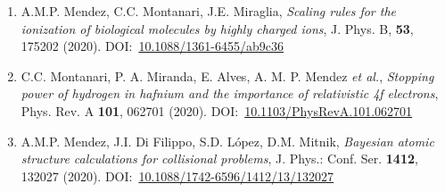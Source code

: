 \begin{enumerate}
\item
A.M.P. Mendez, C.C. Montanari, J.E. Miraglia,
\textit{Scaling rules for the ionization of biological molecules by highly charged ions},
J. Phys. B, \textbf{53}, 175202 (2020). 
DOI:~\href{http://www.doi.org/10.1088/1361-6455/ab9c36}{10.1088/1361-6455/ab9c36}

\item
C.C. Montanari, P. A. Miranda, E. Alves, A. M. P. Mendez \textit{et al.},
\textit{Stopping power of hydrogen in hafnium and the importance of relativistic 4f electrons},
Phys. Rev. A \textbf{101}, 062701 (2020).
DOI:~\href{http://www.doi.org/10.1103/PhysRevA.101.062701}{10.1103/PhysRevA.101.062701}

\item
A.M.P. Mendez, J.I. Di Filippo, S.D. López, D.M. Mitnik,
\textit{Bayesian atomic structure calculations for collisional problems},
J. Phys.: Conf. Ser. \textbf{1412}, 132027 (2020). 
DOI:~\href{http://www.doi.org/10.1088/1742-6596/1412/13/132027}{10.1088/1742-6596/1412/13/132027}

\end{enumerate}

